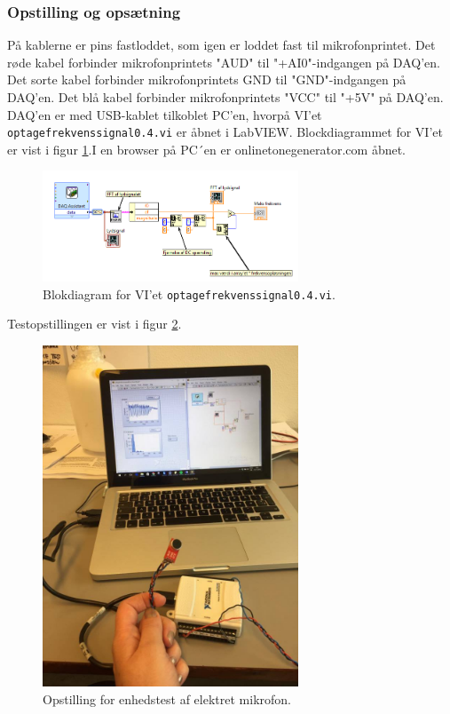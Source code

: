 		\subsubsection{Opstilling og opsætning}
		På kablerne er pins fastloddet, som igen er loddet fast til mikrofonprintet. Det røde kabel forbinder mikrofonprintets "AUD" til "+AI0"-indgangen på DAQ'en. Det sorte kabel forbinder mikrofonprintets GND til "GND"-indgangen på DAQ'en. Det blå kabel forbinder mikrofonprintets "VCC" til "+5V" på DAQ'en. DAQ'en er med USB-kablet tilkoblet PC'en, hvorpå VI'et \texttt{optagefrekvenssignal0.4.vi} er åbnet i LabVIEW. Blockdiagrammet for VI'et er vist i figur \ref{fig:webvi}.I en browser på PC´en er onlinetonegenerator.com åbnet.    
		
		\begin{figure}
			\centering
			\includegraphics[width=3in]{optagefrekvenssignal04}
			\caption{Blokdiagram for VI'et \texttt{optagefrekvenssignal0.4.vi}.}
			\label{fig:webvi}
		\end{figure}
		
		Testopstillingen er vist i figur \ref{fig:webop}.\\
		
		\begin{figure}
			\centering
			\includegraphics[width=3in]{webcamop.jpg}
			\caption{Opstilling for enhedstest af elektret mikrofon.}
			\label{fig:webop}
		\end{figure}
	
